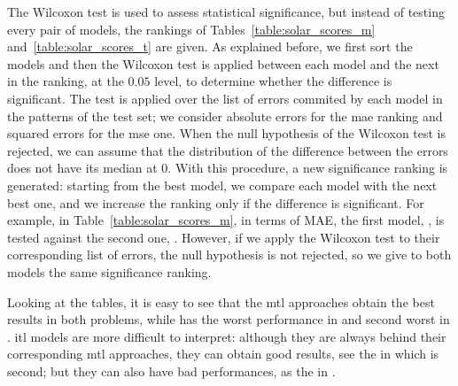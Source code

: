 The Wilcoxon test is used to assess statistical significance, but instead of testing every pair of models, the rankings of Tables~\ref{table:solar_scores_m} and~\ref{table:solar_scores_t} are given. As explained before, we first sort the models and then the Wilcoxon test is applied between each model and the next in the ranking, at the $0.05$ level, to determine whether the difference is significant.
The test is applied over the list of errors commited by each model in the patterns of the test set; we consider absolute errors for the \acrshort{mae} ranking and squared errors for the \acrshort{mse} one. 
%
When the null hypothesis of the Wilcoxon test is rejected, we can assume that the distribution of the difference between the errors does not have its median at $0$.
%
With this procedure, a new significance ranking is generated: starting from the best model, we compare each model with the next best one, and we increase the ranking only if the difference is significant. 
%
For example, in Table~\ref{table:solar_scores_m}, in terms of MAE, the first model, , is tested against the second one, . 
However, if we apply the Wilcoxon test to their corresponding list of errors, the null hypothesis is not rejected, so we give to both models the same significance ranking.

%
Looking at the tables, it is easy to see that the \acrshort{mtl} approaches obtain the best results in both problems, while  has the worst performance in  and second worst in .
\acrshort{itl} models are more difficult to interpret: although they are always behind their corresponding \acrshort{mtl} approaches, they can obtain good results, see the  in  which is second; but they can also have bad performances, as the  in .

